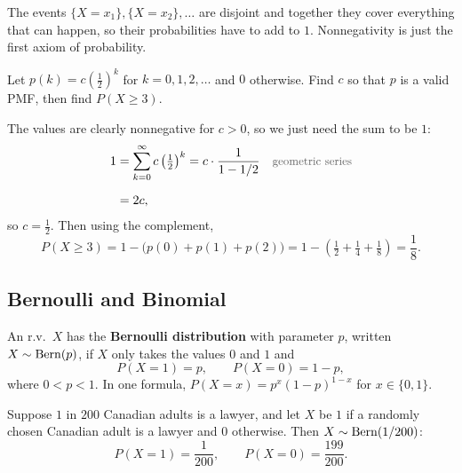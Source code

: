 \bigskip

\begin{intuition}
The events $\{X = x_1\}, \{X = x_2\}, \dots$ are disjoint and together they cover everything that can happen, so their probabilities have to add to $1$. Nonnegativity is just the first axiom of probability.
\end{intuition}

\bigskip

\begin{example}
Let $p(k) = c \left(\tfrac{1}{2}\right)^{k}$ for $k = 0, 1, 2, \dots$ and $0$ otherwise. Find $c$ so that $p$ is a valid PMF, then find $P(X \ge 3)$.
\end{example}

\medskip

\begin{solution}
The values are clearly nonnegative for $c > 0$, so we just need the sum to be $1$:
\medskip
\begin{align*}
1 &= \sum_{k=0}^{\infty} c \left(\tfrac{1}{2}\right)^{k}
   = c \cdot \frac{1}{1 - 1/2}
  && \by{geometric series} \\[0.6em]
  &= 2c,
\end{align*}
\medskip
so $c = \tfrac{1}{2}$. Then using the complement,
\medskip
\[
P(X \ge 3) = 1 - \bigl(p(0) + p(1) + p(2)\bigr) = 1 - \left(\tfrac{1}{2} + \tfrac{1}{4} + \tfrac{1}{8}\right) = \frac{1}{8}.
\]
\end{solution}

\bigskip

\subsection{Bernoulli and Binomial}

\bigskip

\begin{definition}\label{def:bern}
An r.v.\ $X$ has the \textbf{Bernoulli distribution} with parameter $p$, written $X \sim \operatorname{Bern}(p)$, if $X$ only takes the values $0$ and $1$ and
\medskip
\[
P(X = 1) = p, \qquad P(X = 0) = 1 - p,
\]
\medskip
where $0 < p < 1$. In one formula, $P(X = x) = p^{x}(1 - p)^{1 - x}$ for $x \in \{0, 1\}$.
\end{definition}

\bigskip

\begin{example}[Lawyers]
Suppose $1$ in $200$ Canadian adults is a lawyer, and let $X$ be $1$ if a randomly chosen Canadian adult is a lawyer and $0$ otherwise. Then $X \sim \operatorname{Bern}(1/200)$:
\medskip
\[
P(X = 1) = \frac{1}{200}, \qquad P(X = 0) = \frac{199}{200}.
\]
\end{example}

